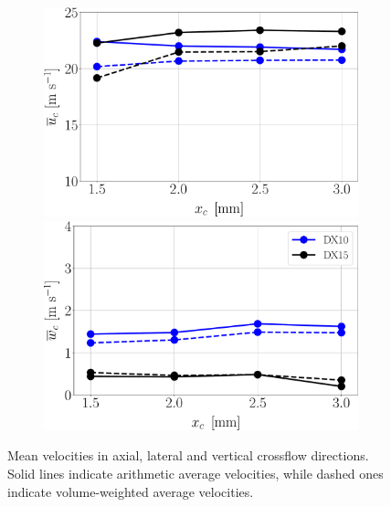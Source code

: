 \begin{figure}[ht]
\flushleft
\begin{subfigure}[b]{1.0\textwidth}
	\flushleft
   \includegraphics[scale=0.25]{./part3_applications/figures_ch8_resolved/SPRAY_characterization/velocities/ux_mean}
   \hspace*{0.2in}
   \includegraphics[scale=0.25]{./part3_applications/figures_ch8_resolved/SPRAY_characterization/velocities/uz_mean}
\end{subfigure}

   \caption[Sampled mean liquid velocities for all cases]{Mean velocities in axial, lateral and vertical crossflow directions. Solid lines indicate arithmetic average velocities, while dashed ones indicate volume-weighted average velocities.}
\label{fig:ch8_jicf_liquid_mean_velocities_with_x}
\end{figure}


